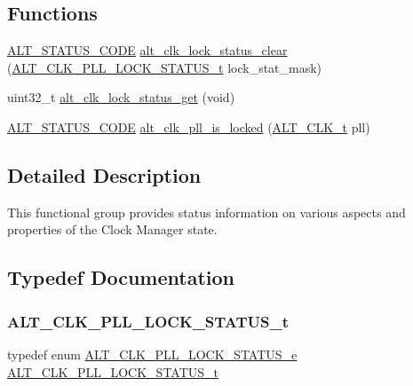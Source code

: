 \subsection*{Functions}
\begin{DoxyCompactItemize}
\item 
\mbox{\hyperlink{hwlib_8h_abdb0d369f069723ca55d6c94bcaaaa12}{A\+L\+T\+\_\+\+S\+T\+A\+T\+U\+S\+\_\+\+C\+O\+DE}} \mbox{\hyperlink{group__CLK__MGR__STATUS_ga8418718b0efdf2b2c69242265ff1581a}{alt\+\_\+clk\+\_\+lock\+\_\+status\+\_\+clear}} (\mbox{\hyperlink{group__CLK__MGR__STATUS_ga62fbfc277685cad341f57ee0a252092c}{A\+L\+T\+\_\+\+C\+L\+K\+\_\+\+P\+L\+L\+\_\+\+L\+O\+C\+K\+\_\+\+S\+T\+A\+T\+U\+S\+\_\+t}} lock\+\_\+stat\+\_\+mask)
\item 
uint32\+\_\+t \mbox{\hyperlink{group__CLK__MGR__STATUS_gad22a977022a50a543770201166ed9e24}{alt\+\_\+clk\+\_\+lock\+\_\+status\+\_\+get}} (void)
\item 
\mbox{\hyperlink{hwlib_8h_abdb0d369f069723ca55d6c94bcaaaa12}{A\+L\+T\+\_\+\+S\+T\+A\+T\+U\+S\+\_\+\+C\+O\+DE}} \mbox{\hyperlink{group__CLK__MGR__STATUS_gaa5e6d0472bb24f915e7a658aec48dec9}{alt\+\_\+clk\+\_\+pll\+\_\+is\+\_\+locked}} (\mbox{\hyperlink{group__CLK__MGR_ga4cdb80e84284365fe3d47c2f8050b13d}{A\+L\+T\+\_\+\+C\+L\+K\+\_\+t}} pll)
\end{DoxyCompactItemize}


\subsection{Detailed Description}
This functional group provides status information on various aspects and properties of the Clock Manager state. 

\subsection{Typedef Documentation}
\mbox{\label{group__CLK__MGR__STATUS_ga62fbfc277685cad341f57ee0a252092c}} 
\subsubsection{\texorpdfstring{ALT\_CLK\_PLL\_LOCK\_STATUS\_t}{ALT\_CLK\_PLL\_LOCK\_STATUS\_t}}
{\footnotesize\ttfamily typedef enum \mbox{\hyperlink{group__CLK__MGR__STATUS_gafe0eda739fa3d56ec20c0ea5b328cb49}{A\+L\+T\+\_\+\+C\+L\+K\+\_\+\+P\+L\+L\+\_\+\+L\+O\+C\+K\+\_\+\+S\+T\+A\+T\+U\+S\+\_\+e}}  \mbox{\hyperlink{group__CLK__MGR__STATUS_ga62fbfc277685cad341f57ee0a252092c}{A\+L\+T\+\_\+\+C\+L\+K\+\_\+\+P\+L\+L\+\_\+\+L\+O\+C\+K\+\_\+\+S\+T\+A\+T\+U\+S\+\_\+t}}}

